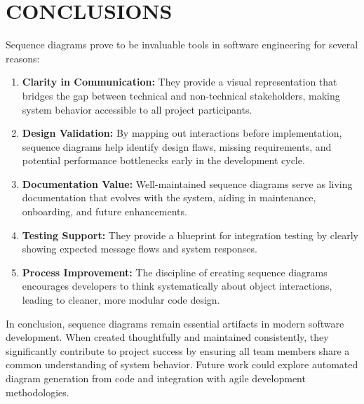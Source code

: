 \chapter{CONCLUSIONS}\label{ch:conclusion}


Sequence diagrams prove to be invaluable tools in software engineering for several reasons:

\begin{enumerate}
    \item \textbf{Clarity in Communication:} They provide a visual representation that bridges the gap between technical and non-technical stakeholders, making system behavior accessible to all project participants.

    \item \textbf{Design Validation:} By mapping out interactions before implementation, sequence diagrams help identify design flaws, missing requirements, and potential performance bottlenecks early in the development cycle.

    \item \textbf{Documentation Value:} Well-maintained sequence diagrams serve as living documentation that evolves with the system, aiding in maintenance, onboarding, and future enhancements.

    \item \textbf{Testing Support:} They provide a blueprint for integration testing by clearly showing expected message flows and system responses.

    \item \textbf{Process Improvement:} The discipline of creating sequence diagrams encourages developers to think systematically about object interactions, leading to cleaner, more modular code design.
\end{enumerate}

In conclusion, sequence diagrams remain essential artifacts in modern software development. When created thoughtfully and maintained consistently, they significantly contribute to project success by ensuring all team members share a common understanding of system behavior. Future work could explore automated diagram generation from code and integration with agile development methodologies.
